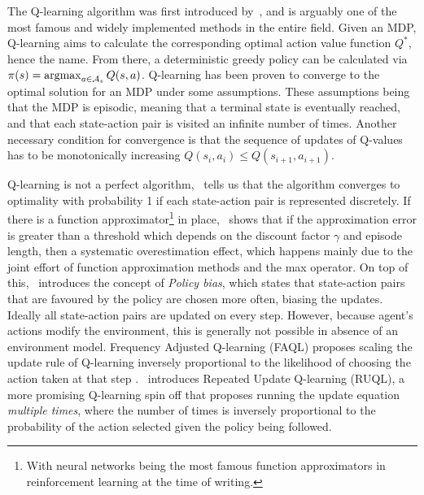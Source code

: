 \documentclass{../main.tex}{subfiles}
\begin{document}
The Q-learning algorithm was first introduced by~\cite{Watkins1989}, and is arguably one of the most famous and widely implemented methods in the entire field. Given an MDP, Q-learning aims to calculate the corresponding optimal action value function $Q^*$, hence the name. From there, a deterministic greedy policy can be calculated via $\pi(s) = \operatorname*{argmax}_{a \in \mathcal{A}_s} Q(s, a)$. Q-learning has been proven to converge to the optimal solution for an MDP under some assumptions. These assumptions being that the MDP is episodic,  meaning that a terminal state is eventually reached, and that each state-action pair is visited an infinite number of times. Another necessary condition for convergence is that the sequence of updates of Q-values has to be monotonically increasing  $Q(s_i, a_i) \leq Q(s_{i+1}, a_{i+1})$.


Q-learning is not a perfect algorithm,~\cite{Watkins1992} tells us that the algorithm converges to optimality with probability 1 if each state-action pair is represented discretely. If there is a function approximator\footnote{With neural networks being the most famous function approximators in reinforcement learning at the time of writing.} in place,~\cite{Thrun1993} shows that if the approximation error is greater than a threshold which depends on the discount factor $\gamma$ and episode length, then a systematic overestimation effect, which happens mainly due to the joint effort of function approximation methods and the max operator. On top of this,~\cite{Kaisers2010} introduces the concept of \textit{Policy bias}, which states that state-action pairs that are favoured by the policy are chosen more often, biasing the updates. Ideally all state-action pairs are updated on every step. However, because agent's actions modify the environment, this is generally not possible in absence of an environment model. Frequency Adjusted Q-learning (FAQL) proposes scaling the update rule of Q-learning inversely proportional to the likelihood of choosing the action taken at that step \citep{Kaisers2010}.~\cite{Abdallah2016} introduces Repeated Update Q-learning (RUQL), a more promising Q-learning spin off that proposes running the update equation \textit{multiple times}, where the number of times is inversely proportional to the probability of the action selected given the policy being followed.

\end{document}
